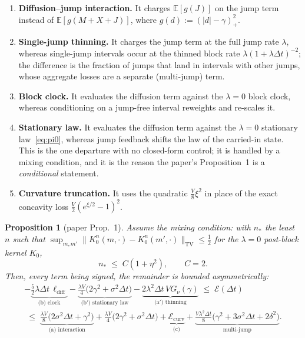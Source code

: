 \documentclass[11pt]{article}
\newtheorem{proposition}{Proposition}
\theoremstyle{definition}
\theoremstyle{remark}
\newcommand{\E}{\mathbb{E}}
\newcommand{\dt}{\Delta t}
\newcommand{\1}{\mathbf{1}}
\begin{document}
\begin{enumerate}[leftmargin=2em]
\item[(a)] \textbf{Diffusion--jump interaction.} It charges $\E[g(J)]$ on the jump term instead of $\E[g(M+X+J)]$, where $g(d) := (|d|-\gamma)_+^2$.
\item[(a$'$)] \textbf{Single-jump thinning.} It charges the jump term at the full jump rate $\lambda$, whereas single-jump intervals occur at the thinned block rate $\lambda(1+\lambda\dt)^{-2}$; the difference is the fraction of jumps that land in intervals with other jumps, whose aggregate losses are a separate (multi-jump) term.
\item[(b)] \textbf{Block clock.} It evaluates the diffusion term against the $\lambda=0$ block clock, whereas conditioning on a jump-free interval reweights and re-scales it.
\item[(b$'$)] \textbf{Stationary law.} It evaluates the diffusion term against the $\lambda=0$ stationary law~\eqref{eq:pi0}, whereas jump feedback shifts the law of the carried-in state. This is the one departure with no closed-form control; it is handled by a mixing condition, and it is the reason the paper's Proposition~1 is a \emph{conditional} statement.
\item[(c)] \textbf{Curvature truncation.} It uses the quadratic $\tfrac{V}{8}\xi^2$ in place of the exact concavity loss $\tfrac{V}{2}(e^{\xi/2}-1)^2$.
\end{enumerate}

\begin{proposition}[paper Prop.~1]\label{prop:err}
Assume the mixing condition: with $n_*$ the least $n$ such that $\sup_{m,m'}\|K_0^n(m,\cdot)-K_0^n(m',\cdot)\|_{\mathrm{TV}}\le\tfrac12$ for the $\lambda=0$ post-block kernel $K_0$,
\[
n_* \;\le\; C(1+\eta^2), \qquad C = 2. \tag{M}
\]
Then, every term being signed, the remainder is bounded asymmetrically:
\begin{multline*}
-\underbrace{\tfrac52\lambda\dt\,\ell_{\mathrm{diff}}}_{\text{(b) clock}} - \underbrace{\tfrac{\lambda V}{4}\big(2\gamma^2+\sigma^2\dt\big)}_{\text{(b$'$) stationary law}} - \underbrace{2\lambda^2\dt\,VG_\nu(\gamma)}_{\text{(a$'$) thinning}}
\;\le\; \mathcal E(\dt)\\
\;\le\;
\underbrace{\tfrac{\lambda V}{8}\big(2\sigma^2\dt+\gamma^2\big)}_{\text{(a) interaction}}
+ \tfrac{\lambda V}{4}\big(2\gamma^2+\sigma^2\dt\big)
+ \underbrace{\mathcal E_{\mathrm{curv}}}_{\text{(c)}}
+ \underbrace{\tfrac{V\lambda^2\dt}{8}\big(\gamma^2+3\sigma^2\dt+2\delta^2\big)}_{\text{multi-jump}} .
\end{multline*}
\end{proposition}
\end{document}
